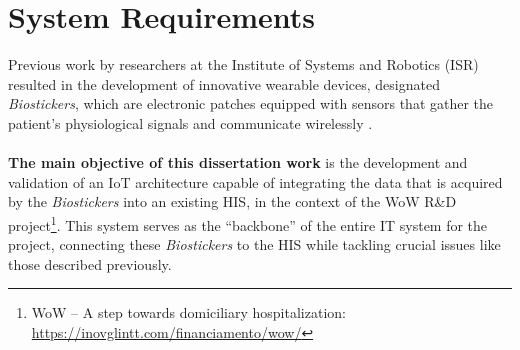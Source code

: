 


\section{System Requirements}

Previous work by researchers at the Institute of Systems and Robotics (ISR) resulted in the development of innovative wearable devices, designated \textit{Biostickers}, which are electronic patches equipped with sensors that gather the patient's physiological signals and communicate wirelessly \cite{Silva2020}. 


\paragraph{} \textbf{The main objective of this dissertation work} is the development and validation of an \acs{IoT} architecture capable of integrating the data that is acquired by the \textit{Biostickers} into an existing \acs{HIS}, in the context of the \acs{WoW} R\&D project\footnote{WoW -- A step towards domiciliary hospitalization: \url{https://inovglintt.com/financiamento/wow/}}. This system serves as the ``backbone'' of the entire \acf{IT} system for the project, connecting these \textit{Biostickers} to the \acs{HIS} while tackling crucial issues like those described previously.


